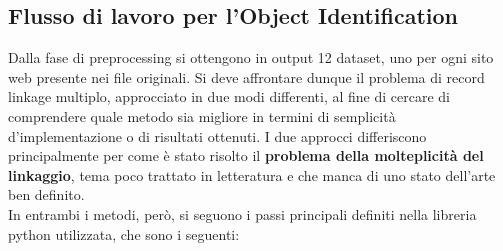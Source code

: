 \documentclass[a4paper,12pt]{article}
\begin{document}
\newpage
\subsection{Flusso di lavoro per l'Object Identification}
Dalla fase di preprocessing si ottengono in output 12 dataset, uno per ogni sito web presente nei file originali. Si deve affrontare dunque il problema di record linkage multiplo, approcciato in due modi differenti, al fine di cercare di comprendere quale metodo sia migliore in termini di semplicità d'implementazione o di risultati ottenuti. I due approcci differiscono principalmente per come è stato risolto il \textbf{problema della molteplicità del linkaggio}, tema poco trattato in letteratura e che manca di uno stato dell'arte ben definito. \\

\noindent In entrambi i metodi, però, si seguono i passi principali definiti nella libreria python utilizzata, che sono i seguenti:
\end{document}
